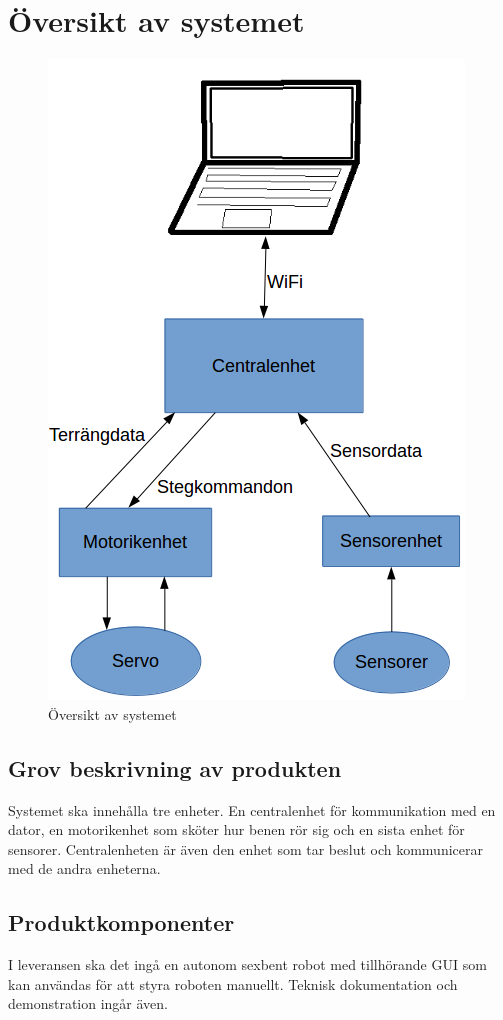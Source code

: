 \documentclass[a4paper,titlepage,12pt]{article}
\begin{document}
	\section{Översikt av systemet}
	\begin{figure}[h!]
		\centering
		\includegraphics[width=0.8\linewidth]{images/overview.png}
		\caption{Översikt av systemet}
		\label{fig:images/overview}
	\end{figure}
	\subsection{Grov beskrivning av produkten}
	Systemet ska innehålla tre enheter. En centralenhet för kommunikation med en dator,
	en motorikenhet som sköter hur benen rör sig och en sista enhet för sensorer.
	Centralenheten är även den enhet som tar beslut och kommunicerar med de 
	andra enheterna. 

	\subsection{Produktkomponenter}
	I leveransen ska det ingå en autonom sexbent robot med tillhörande GUI som kan 
	användas för att styra roboten manuellt. Teknisk dokumentation och demonstration 
	ingår även. 
\end{document}

